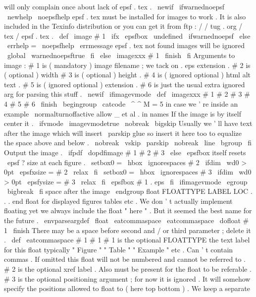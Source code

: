 {{will
only
complain
once
about
lack
of
epsf
.
tex
.
\
newif
\
ifwarnednoepsf
\
newhelp
\
noepsfhelp
{
epsf
.
tex
must
be
installed
for
images
to
work
.
It
is
also
included
in
the
Texinfo
distribution
or
you
can
get
it
from
ftp
:
/
/
tug
.
org
/
tex
/
epsf
.
tex
.
}
%
\
def
\
image
#
1
{
%
\
ifx
\
epsfbox
\
undefined
\
ifwarnednoepsf
\
else
\
errhelp
=
\
noepsfhelp
\
errmessage
{
epsf
.
tex
not
found
images
will
be
ignored
}
%
\
global
\
warnednoepsftrue
\
fi
\
else
\
imagexxx
#
1
\
finish
\
fi
}
%
%
Arguments
to
image
:
%
#
1
is
(
mandatory
)
image
filename
;
we
tack
on
.
eps
extension
.
%
#
2
is
(
optional
)
width
#
3
is
(
optional
)
height
.
%
#
4
is
(
ignored
optional
)
html
alt
text
.
%
#
5
is
(
ignored
optional
)
extension
.
%
#
6
is
just
the
usual
extra
ignored
arg
for
parsing
this
stuff
.
\
newif
\
ifimagevmode
\
def
\
imagexxx
#
1
#
2
#
3
#
4
#
5
#
6
\
finish
{
\
begingroup
\
catcode
\
^
^
M
=
5
%
in
case
we
'
re
inside
an
example
\
normalturnoffactive
%
allow
_
et
al
.
in
names
%
If
the
image
is
by
itself
center
it
.
\
ifvmode
\
imagevmodetrue
\
nobreak
\
bigskip
%
Usually
we
'
ll
have
text
after
the
image
which
will
insert
%
\
parskip
glue
so
insert
it
here
too
to
equalize
the
space
%
above
and
below
.
\
nobreak
\
vskip
\
parskip
\
nobreak
\
line
\
bgroup
\
fi
%
%
Output
the
image
.
\
ifpdf
\
dopdfimage
{
#
1
}
{
#
2
}
{
#
3
}
%
\
else
%
\
epsfbox
itself
resets
\
epsf
?
size
at
each
figure
.
\
setbox0
=
\
hbox
{
\
ignorespaces
#
2
}
\
ifdim
\
wd0
>
0pt
\
epsfxsize
=
#
2
\
relax
\
fi
\
setbox0
=
\
hbox
{
\
ignorespaces
#
3
}
\
ifdim
\
wd0
>
0pt
\
epsfysize
=
#
3
\
relax
\
fi
\
epsfbox
{
#
1
.
eps
}
%
\
fi
%
\
ifimagevmode
\
egroup
\
bigbreak
\
fi
%
space
after
the
image
\
endgroup
}
%
float
FLOATTYPE
LABEL
LOC
.
.
.
end
float
for
displayed
figures
tables
%
etc
.
We
don
'
t
actually
implement
floating
yet
we
always
include
the
%
float
"
here
"
.
But
it
seemed
the
best
name
for
the
future
.
%
\
envparseargdef
\
float
{
\
eatcommaspace
\
eatcommaspace
\
dofloat
#
1
\
finish
}
%
There
may
be
a
space
before
second
and
/
or
third
parameter
;
delete
it
.
\
def
\
eatcommaspace
#
1
{
#
1
}
%
#
1
is
the
optional
FLOATTYPE
the
text
label
for
this
float
typically
%
"
Figure
"
"
Table
"
"
Example
"
etc
.
Can
'
t
contain
commas
.
If
omitted
%
this
float
will
not
be
numbered
and
cannot
be
referred
to
.
%
%
#
2
is
the
optional
xref
label
.
Also
must
be
present
for
the
float
to
%
be
referable
.
%
%
#
3
is
the
optional
positioning
argument
;
for
now
it
is
ignored
.
It
%
will
somehow
specify
the
positions
allowed
to
float
to
(
here
top
bottom
)
.
%
%
We
keep
a
separate
}}
